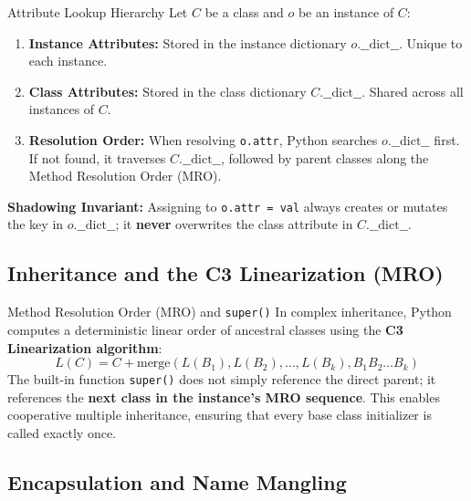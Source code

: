 \begin{theorembox}{Attribute Lookup Hierarchy}
 
Let $C$ be a class and $o$ be an instance of $C$:
\begin{enumerate}
    \item \textbf{Instance Attributes:} Stored in the instance dictionary $o\text{.\_\_dict\_\_}$. Unique to each instance.
    \item \textbf{Class Attributes:} Stored in the class dictionary $C\text{.\_\_dict\_\_}$. Shared across all instances of $C$.
    \item \textbf{Resolution Order:} When resolving \texttt{o.attr}, Python searches $o\text{.\_\_dict\_\_}$ first. If not found, it traverses $C\text{.\_\_dict\_\_}$, followed by parent classes along the Method Resolution Order (MRO).
\end{enumerate}
\textbf{Shadowing Invariant:} Assigning to \texttt{o.attr = val} always creates or mutates the key in $o\text{.\_\_dict\_\_}$; it \textbf{never} overwrites the class attribute in $C\text{.\_\_dict\_\_}$.
\end{theorembox}

\subsection{Inheritance and the C3 Linearization (MRO)}

\begin{theorembox}{Method Resolution Order (MRO) and \texttt{super()}}
  
In complex inheritance, Python computes a deterministic linear order of ancestral classes using the \textbf{C3 Linearization algorithm}:
\begin{equation}
L(C) = C + \text{merge}(L(B_1), L(B_2), \dots, L(B_k), B_1 B_2 \dots B_k)
\end{equation}
The built-in function \texttt{super()} does not simply reference the direct parent; it references the \textbf{next class in the instance's MRO sequence}. This enables cooperative multiple inheritance, ensuring that every base class initializer is called exactly once.
\end{theorembox}

\subsection{Encapsulation and Name Mangling}

